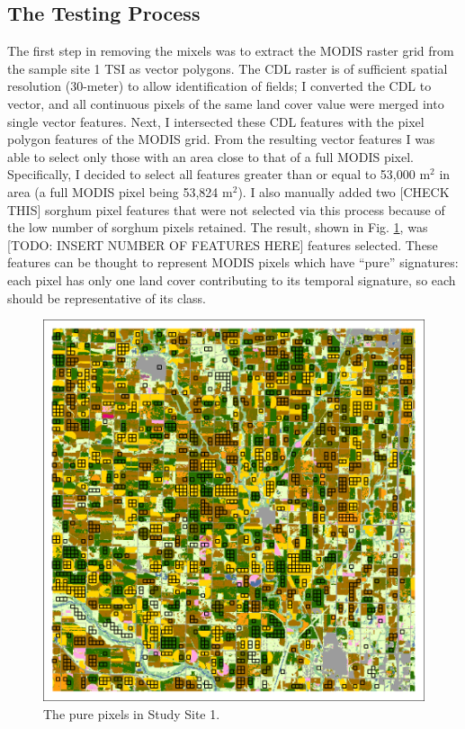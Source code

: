 \subsection*{The Testing Process}

The first step in removing the mixels was to extract the MODIS raster grid from the sample site 1 TSI as vector polygons. The CDL raster is of sufficient spatial resolution (30-meter) to allow identification of fields; I converted the CDL to vector, and all continuous pixels of the same land cover value were merged into single vector features. Next, I intersected these CDL features with the pixel polygon features of the MODIS grid. From the resulting vector features I was able to select only those with an area close to that of a full MODIS pixel. Specifically, I decided to select all features greater than or equal to 53,000 m$^2$ in area (a full MODIS pixel being 53,824 m$^2$). I also manually added two [CHECK THIS] sorghum pixel features that were not selected via this process because of the low number of sorghum pixels retained. The result, shown in Fig. \ref{fig:ss1purepx}, was [TODO: INSERT NUMBER OF FEATURES HERE] features selected. These features can be thought to represent MODIS pixels which have “pure” signatures: each pixel has only one land cover contributing to its temporal signature, so each should be representative of its class.

\begin{figure}
  \centering
  \includegraphics[width=.9\textwidth]{Graphics/Testing/clip1_30mCDL_pure_pixels.pdf}
  \caption{The pure pixels in Study Site 1.}
  \label{fig:ss1purepx}
\end{figure}

